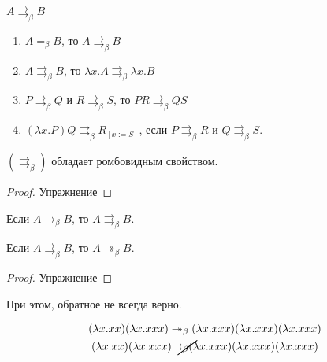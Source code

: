 \begin{definition}
    $A \rightrightarrows_{\beta} B$
    \begin{enumerate}
        \item $A =_{\beta} B$, то $A \rightrightarrows_{\beta}B$
        \item $A \rightrightarrows_{\beta} B$, то $\lambda x.A \rightrightarrows_{\beta} \lambda x . B$
        \item $P \rightrightarrows_{\beta} Q$ и $R \rightrightarrows_{\beta} S$, то $PR \rightrightarrows_{\beta} QS$
        \item $(\lambda x . P) Q \rightrightarrows_{\beta} R_{[x:=S]}$, если 
            $P \rightrightarrows_{\beta}R$ и $Q \rightrightarrows_{\beta} S$.
    \end{enumerate}
\end{definition}

\begin{statement}
    $(\rightrightarrows_{\beta})$ обладает ромбовидным свойством.
\end{statement}

\begin{proof}
    Упражнение %
\end{proof}

\begin{statement}
    Если $A \rightarrow_{\beta} B$, то $A \rightrightarrows_{\beta} B$.
\end{statement}

\begin{statement}
    Если $A \rightrightarrows_{\beta} B$, то $A \twoheadrightarrow_{\beta} B$.
\end{statement}

\begin{proof}
    Упражнение %
\end{proof}

При этом, обратное не всегда верно.

\begin{example}
    \begin{gather*}
        (\lambda x . x x) (\lambda x . x x x) \twoheadrightarrow_{\beta} (\lambda x . x x x)(\lambda x . x x x)(\lambda x . x x x) \\
        (\lambda x . x x) (\lambda x . x x x) \cancel{\rightrightarrows_{\beta}} (\lambda x . x x x)(\lambda x . x x x)(\lambda x . x x x)
    \end{gather*}
\end{example}

